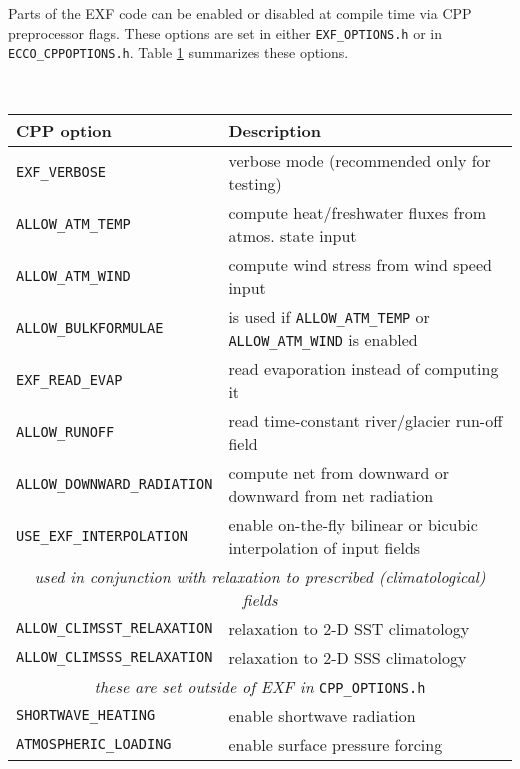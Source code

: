 Parts of the EXF code can be enabled or disabled at compile time
via CPP preprocessor flags. These options are set in either
\texttt{EXF\_OPTIONS.h} or in \texttt{ECCO\_CPPOPTIONS.h}.
Table \ref{tab:pkg:exf:cpp} summarizes these options.

\begin{table}[b!]
  \centering
  {\footnotesize
    \begin{tabular}{|l|l|}
      \hline 
      \textbf{CPP option}  &  \textbf{Description}  \\
      \hline \hline
        \texttt{EXF\_VERBOSE} & 
          verbose mode (recommended only for testing) \\
        \texttt{ALLOW\_ATM\_TEMP} & 
          compute heat/freshwater fluxes from atmos. state input \\
        \texttt{ALLOW\_ATM\_WIND} & 
          compute wind stress from wind speed input\\
        \texttt{ALLOW\_BULKFORMULAE} & 
          is used if \texttt{ALLOW\_ATM\_TEMP} or 
          \texttt{ALLOW\_ATM\_WIND} is enabled \\
        \texttt{EXF\_READ\_EVAP} & read evaporation instead of computing it \\
        \texttt{ALLOW\_RUNOFF} & read time-constant river/glacier run-off field \\
        \texttt{ALLOW\_DOWNWARD\_RADIATION} & compute net from downward or downward from net radiation \\
        \texttt{USE\_EXF\_INTERPOLATION} & enable on-the-fly bilinear or bicubic interpolation of input fields \\
      \hline
         \multicolumn{2}{|c|}{\textit{used in conjunction with relaxation to prescribed (climatological) fields}} \\
         \hline
        \texttt{ALLOW\_CLIMSST\_RELAXATION} &
          relaxation to 2-D SST climatology \\
        \texttt{ALLOW\_CLIMSSS\_RELAXATION} &
          relaxation to 2-D SSS climatology  \\
      \hline
         \multicolumn{2}{|c|}{\textit{these are set outside of EXF in} \texttt{CPP\_OPTIONS.h}} \\
         \hline
        \texttt{SHORTWAVE\_HEATING} & enable shortwave radiation \\
        \texttt{ATMOSPHERIC\_LOADING} & enable surface pressure forcing \\
      \hline
    \end{tabular}
  }
  \caption{~}
  \label{tab:pkg:exf:cpp}
\end{table}


